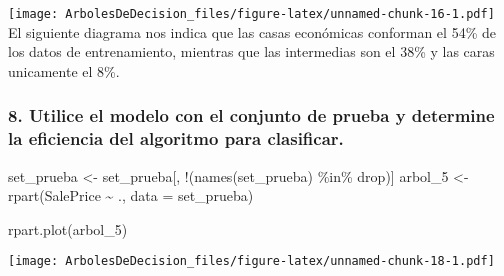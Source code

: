 \documentclass[
]{article}
\newenvironment{Shaded}{\begin{snugshade}}{\end{snugshade}}
\newcommand{\AttributeTok}[1]{\textcolor[rgb]{0.77,0.63,0.00}{#1}}
\newcommand{\DecValTok}[1]{\textcolor[rgb]{0.00,0.00,0.81}{#1}}
\newcommand{\FunctionTok}[1]{\textcolor[rgb]{0.00,0.00,0.00}{#1}}
\newcommand{\NormalTok}[1]{#1}
\newcommand{\OtherTok}[1]{\textcolor[rgb]{0.56,0.35,0.01}{#1}}
\newcommand{\SpecialCharTok}[1]{\textcolor[rgb]{0.00,0.00,0.00}{#1}}
\begin{document}
\texttt{[image: ArbolesDeDecision\_files/figure-latex/unnamed-chunk-16-1.pdf]}
El siguiente diagrama nos indica que las casas económicas conforman el
54\% de los datos de entrenamiento, mientras que las intermedias son el
38\% y las caras unicamente el 8\%.

\hypertarget{utilice-el-modelo-con-el-conjunto-de-prueba-y-determine-la-eficiencia-del-algoritmo-para-clasificar.}{%
\subsubsection{8. Utilice el modelo con el conjunto de prueba y
determine la eficiencia del algoritmo para
clasificar.}\label{utilice-el-modelo-con-el-conjunto-de-prueba-y-determine-la-eficiencia-del-algoritmo-para-clasificar.}}

\begin{Shaded}
\begin{Highlighting}[]
\NormalTok{set\_prueba }\OtherTok{\textless{}{-}}\NormalTok{ set\_prueba[, }\SpecialCharTok{!}\NormalTok{(}\FunctionTok{names}\NormalTok{(set\_prueba) }\SpecialCharTok{\%in\%}\NormalTok{ drop)]}
\NormalTok{arbol\_5 }\OtherTok{\textless{}{-}} \FunctionTok{rpart}\NormalTok{(SalePrice }\SpecialCharTok{\textasciitilde{}}\NormalTok{ ., }\AttributeTok{data =}\NormalTok{ set\_prueba)}
\end{Highlighting}
\end{Shaded}

\begin{Shaded}
\begin{Highlighting}[]
\FunctionTok{rpart.plot}\NormalTok{(arbol\_5)}
\end{Highlighting}
\end{Shaded}

\texttt{[image: ArbolesDeDecision\_files/figure-latex/unnamed-chunk-18-1.pdf]}

\begin{Shaded}
\end{Shaded}
\end{document}
